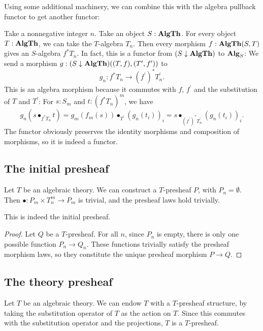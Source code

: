 Using some additional machinery, we can combine this with the algebra pullback functor to get another functor:
\begin{definition}\label{def:theory-algebra-pullback-functor}
  Take a nonnegative integer $ n $. Take an object $ S : \mathbf{AlgTh} $. For every object $ T : \mathbf{AlgTh} $, we can take the $ T $-algebra $ T_n $. Then every morphism $ f: \mathbf{AlgTh}(S, T) $ gives an $ S $-algebra $ f^* T_n $. In fact, this is a functor from $ (S \downarrow \mathbf{AlgTh}) $ to $ \mathbf{Alg}_{S} $: We send a morphism $ g: (S \downarrow \mathbf{AlgTh})((T, f), (T^\prime, f^\prime)) $ to
  \[ g_n: f^* T_n \to (f^\prime)^* T^\prime_n. \]
  This is an algebra morphism because it commutes with $ f $, $ f^\prime $ and the substitution of $ T $ and $ T^\prime $: For $ s: S_m $ and $ t: (f^* T_n)^m $, we have
  \[
      g_n(s \bullet_{f^* T_n} t)
    = g_m(f_m(s)) \bullet_{T^\prime} (g_n(t_i))_i
    = s \bullet_{(f^\prime)^* T^\prime_n} (g_n(t_i))_i.
  \]
  The functor obviously preserves the identity morphisms and composition of morphisms, so it is indeed a functor.
\end{definition}

\subsection{The initial presheaf}
\begin{example}
  Let $ T $ be an algebraic theory. We can construct a $ T $-presheaf $ P $, with $ P_n = \emptyset $. Then $ \bullet : P_m \times T_n^m \to P_m $ is trivial, and the presheaf laws hold trivially.
\end{example}

\begin{lemma}
  This is indeed the initial presheaf.
\end{lemma}
\begin{proof}
  Let $ Q $ be a $ T $-presheaf. For all $ n $, since $ P_n $ is empty, there is only one possible function $ P_n \to Q_n $. These functions trivially satisfy the presheaf morphism laws, so they constitute the unique presheaf morphism $ P \to Q $.
\end{proof}

\subsection{The theory presheaf}
\begin{example}
  Let $ T $ be an algebraic theory. We can endow $ T $ with a $ T $-presheaf structure, by taking the substitution operator of $ T $ as the action on $ T $. Since this commutes with the substitution operator and the projections, $ T $ is a $ T $-presheaf.
\end{example}

